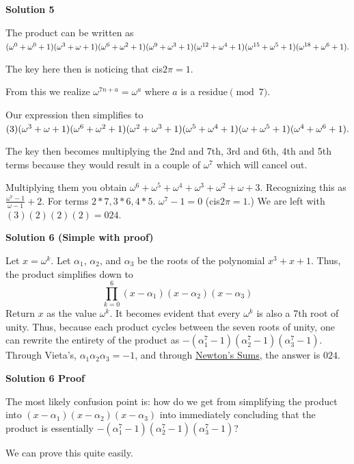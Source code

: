 \begin{enumerate}
\textbf{Solution 5}

The product can be written as $(\omega^0+\omega^0+1)(\omega^3+\omega+1)(\omega^6+\omega^2+1)(\omega^9+\omega^3+1)\\(\omega^{12}+\omega^4+1)(\omega^{15}+\omega^5+1)(\omega^{18}+\omega^6+1).$ 

 The key here then is noticing that cis$2\pi=1.$ 

 From this we realize $\omega^{7n+a}=\omega^a$ where $a$ is a residue$\pmod 7.$

 Our expression then simplifies to $(3)(\omega^3+\omega+1)(\omega^6+\omega^2+1)(\omega^2+\omega^3+1)\\(\omega^5+\omega^4+1)(\omega+\omega^5+1)(\omega^4+\omega^6+1).$

 The key then becomes multiplying the 2nd and 7th, 3rd and 6th, 4th and 5th terms because they would result in a couple of $\omega^7$ which will cancel out.

 Multiplying them you obtain $\omega^6+\omega^5+\omega^4+\omega^3+\omega^2+\omega+3$. Recognizing this as $\frac{\omega^7-1}{\omega-1}+2.$ For terms $2*7, 3*6, 4*5.$
$\omega^7-1=0$ (cis$2\pi=1.$) We are left with $(3)(2)(2)(2)=\boxed{024}.$




\textbf{Solution 6 (Simple with proof)}

Let \( x = \omega^k \). Let \( \alpha_1 \), \( \alpha_2 \), and \( \alpha_3 \) be the roots of the polynomial \( x^3 + x + 1 \). Thus, the product simplifies down to
 \[\prod_{k=0}^6 (x - \alpha_1)(x - \alpha_2)(x - \alpha_3)\]Return \( x \) as the value \( \omega^k \). It becomes evident that every \( \omega^k \) is also a 7th root of unity. Thus, because each product cycles between the seven roots of unity, one can rewrite the entirety of the product as \( -(\alpha_1^7 - 1)(\alpha_2^7 - 1)(\alpha_3^7 - 1) \). Through Vieta's, \( \alpha_1 \alpha_2 \alpha_3 = -1 \), and through \href{https://artofproblemsolving.com/wiki/index.php?title=Newton\%27s\_Sums}{Newton's Sums}, the answer is $\boxed{024}$.

 



\textbf{Solution 6 Proof}

The most likely confusion point is: how do we get from simplifying the product into $(x-\alpha_1)(x-\alpha_2)(x-\alpha_3)$ into immediately concluding that the product is essentially $-(\alpha_1^7-1)(\alpha_2^7-1)(\alpha_3^7-1)$?

 We can prove this quite easily.


\end{enumerate}
